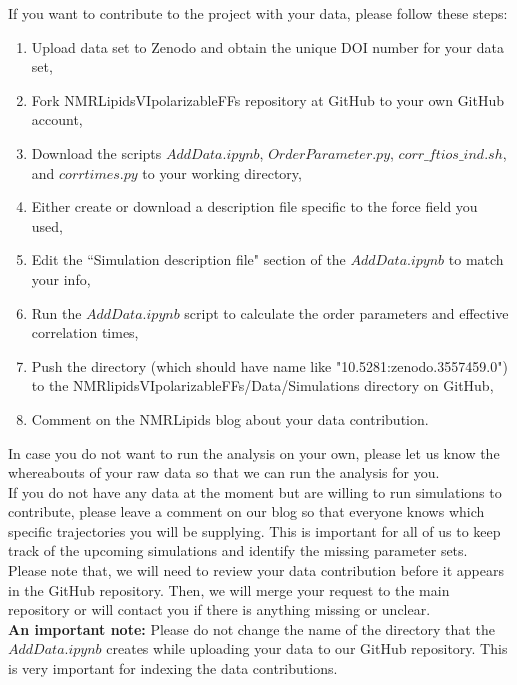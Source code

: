 \documentclass[12pt]{article}
\begin{document}
If you want to contribute to the project with your data, please follow these steps:

\begin{enumerate}
	\item Upload data set to Zenodo and obtain the unique DOI number for your data set,
	\item Fork NMRLipidsVIpolarizableFFs repository at GitHub to your own GitHub account,
	\item Download the scripts $AddData.ipynb$, $OrderParameter.py$, $corr\_ftios\_ind.sh$, and $corrtimes.py$ to your working directory,
	\item Either create or download a description file specific to the force field you used,
	\item Edit the ``Simulation description file" section of the $AddData.ipynb$ to match your info,
	\item Run the $AddData.ipynb$ script to calculate the order parameters and effective correlation times,
	\item Push the directory (which should have name like "10.5281:zenodo.3557459.0") to the NMRlipidsVIpolarizableFFs/Data/Simulations directory on GitHub,
	\item Comment on the NMRLipids blog about your data contribution.
\end{enumerate}

In case you do not want to run the analysis on your own, please let us know the whereabouts of your raw data so that we can run the analysis for you.\\

If you do not have any data at the moment but are willing to run simulations to contribute, please leave a comment on our blog so that everyone knows which specific trajectories you will be supplying. This is important for all of us to keep track of the upcoming simulations and identify the missing parameter sets.\\

Please note that, we will need to review your data contribution before it appears in the GitHub repository. Then, we will merge your request to the main repository or will contact you if there is anything missing or unclear.\\

\textbf{An important note:} Please do not change the name of the directory that the $AddData.ipynb$ creates while uploading your data to our GitHub repository. This is very important for indexing the data contributions.\\
\end{document}

